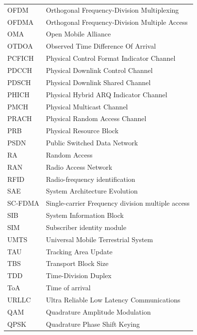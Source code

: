 \documentclass[finnish, 12pt, a4paper, elec, latin1, utf8, online]{aaltothesis}
\begin{document}
\begin{tabular}{ll}
OFDM & Orthogonal Frequency-Division Multiplexing \\
OFDMA & Orthogonal Frequency-Division Multiple Access \\
OMA & Open Mobile Alliance \\
OTDOA & Observed Time Difference Of Arrival \\
PCFICH & Physical Control Format Indicator Channel \\
PDCCH & Physical Downlink Control Channel \\
PDSCH & Physical Downlink Shared Channel \\
PHICH & Physical Hybrid ARQ Indicator Channel \\
PMCH & Physical Multicast Channel \\
PRACH & Physical Random Access Channel \\
PRB & Physical Resource Block \\
PSDN & Public Switched Data Network \\
RA & Random Access \\
RAN & Radio Access Network \\
RFID & Radio-frequency identification \\
SAE & System Architecture Evolution \\
SC-FDMA & Single-carrier Frequency division multiple access\\
SIB & System Information Block \\
SIM & Subscriber identity module \\
UMTS & Universal Mobile Terrestrial System \\
TAU & Tracking Area Update \\
TBS & Transport Block Size \\
TDD & Time-Division Duplex \\
ToA & Time of arrival \\
URLLC & Ultra Reliable Low Latency Communications \\
QAM & Quadrature Amplitude Modulation \\
QPSK & Quadrature Phase Shift Keying \\
\end{tabular}

\cleardoublepage
\end{document}
